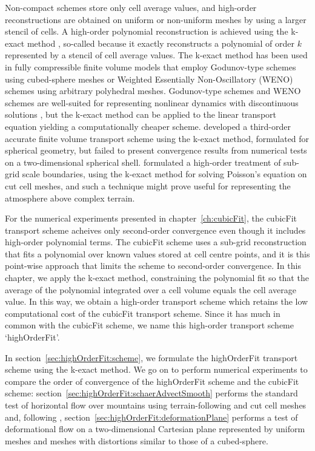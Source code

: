 Non-compact schemes store only cell average values, and high-order reconstructions are obtained on uniform or non-uniform meshes by using a larger stencil of cells.
A high-order polynomial reconstruction is achieved using the k-exact method \citep{barth1995}, so-called because it exactly reconstructs a polynomial of order $k$ represented by a stencil of cell average values.
The k-exact method has been used in fully compressible finite volume models that employ Godunov-type schemes \citep{ullrich-jablonowski2012} using cubed-sphere meshes or Weighted Essentially Non-Oscillatory (WENO) schemes \citep{tsoutsanis-drikakis2016} using arbitrary polyhedral meshes.
Godunov-type schemes and WENO schemes are well-suited for representing nonlinear dynamics with discontinuous solutions \citep{leveque2002}, but the k-exact method can be applied to the linear transport equation yielding a computationally cheaper scheme.
\citet{sjoegreen2012} developed a third-order accurate finite volume transport scheme using the k-exact method, formulated for spherical geometry, but failed to present convergence results from numerical tests on a two-dimensional spherical shell.
\citet{devendran2017} formulated a high-order treatment of sub-grid scale boundaries, using the k-exact method for solving Poisson's equation on cut cell meshes, and such a technique might prove useful for representing the atmosphere above complex terrain.

For the numerical experiments presented in chapter~\ref{ch:cubicFit}, the cubicFit transport scheme acheives only second-order convergence even though it includes high-order polynomial terms.
The cubicFit scheme uses a sub-grid reconstruction that fits a polynomial over known values stored at cell centre points, and it is this point-wise approach that limits the scheme to second-order convergence.
In this chapter, we apply the k-exact method, constraining the polynomial fit so that the average of the polynomial integrated over a cell volume equals the cell average value.
In this way, we obtain a high-order transport scheme which retains the low computational cost of the cubicFit transport scheme.
Since it has much in common with the cubicFit scheme, we name this high-order transport scheme `highOrderFit'.

In section~\ref{sec:highOrderFit:scheme}, we formulate the highOrderFit transport scheme using the k-exact method.
We go on to perform numerical experiments to compare the order of convergence of the highOrderFit scheme and the cubicFit scheme: section~\ref{sec:highOrderFit:schaerAdvectSmooth} performs the standard test of horizontal flow over mountains using terrain-following and cut cell meshes and, following \citep{chen2017}, section~\ref{sec:highOrderFit:deformationPlane} performs a test of deformational flow on a two-dimensional Cartesian plane represented by uniform meshes and meshes with distortions similar to those of a cubed-sphere.





